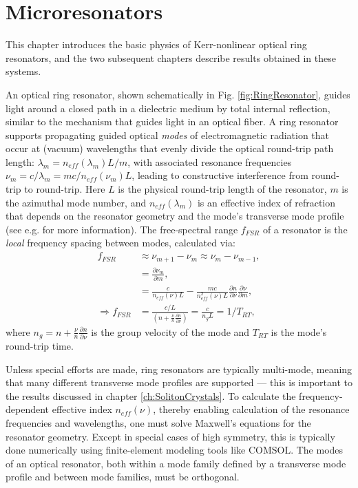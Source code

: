 \chapter{Microresonators}
 \label{ch:microresonators}
 
 This chapter introduces the basic physics of Kerr-nonlinear optical ring resonators, and the two  subsequent chapters describe results obtained in these systems.
 
An optical ring resonator, shown schematically in Fig. \ref{fig:RingResonator}, guides light around a closed path in a dielectric medium by total internal reflection, similar to the mechanism that guides light in an optical fiber. A ring resonator supports propagating guided optical \textit{modes} of electromagnetic radiation that occur at (vacuum) wavelengths that evenly divide the optical round-trip path length: $\lambda_m=n_{eff}(\lambda_m)L/m$, with associated resonance frequencies $\nu_m=c/\lambda_m=mc/n_{eff}(\nu_m)L$, leading to constructive interference from round-trip to round-trip. Here $L$ is the physical round-trip length of the resonator, $m$ is the azimuthal mode number, and $n_{eff}(\lambda_m)$ is an effective index of refraction that depends on the resonator geometry and the mode's transverse mode profile (see e.g. \cite{REFHERE} for more information). The free-spectral range $f_{FSR}$ of a resonator is the \textit{local} frequency spacing between modes, calculated via:
\begin{align}
	f_{FSR}&\approx \nu_{m+1}-\nu_{m}\approx \nu_{m}-\nu_{m-1},\\
	&=\frac{\partial\nu_m}{\partial m},\\
	&=\frac{c}{n_{eff}(\nu)L}-\frac{mc}{n_{eff}^2(\nu)L}\frac{\partial n}{\partial \nu}\frac{\partial \nu}{\partial m},\\
	\Rightarrow f_{FSR}&=\frac{c/L}{\left(n+\frac{\nu}{n}\frac{\partial n}{\partial \nu}\right)}=\frac{c}{n_g L}=1/T_{RT},
\end{align}
	where $n_g=n+\frac{\nu}{n}\frac{\partial n}{\partial \nu}$ is the group velocity of the mode and $T_{RT}$ is the mode's round-trip time.
	
	 Unless special efforts are made, ring resonators are typically multi-mode, meaning that many different transverse mode profiles are supported --- this is important to the results discussed in chapter \ref{ch:SolitonCrystals}. To calculate the frequency-dependent effective index $n_{eff}(\nu)$, thereby enabling calculation of the resonance frequencies and wavelengths, one must solve Maxwell's equations for the resonator geometry. Except in special cases of high symmetry, this is typically done numerically using finite-element modeling tools like COMSOL. The modes of an optical resonator, both within a mode family defined by a transverse mode profile and between mode families, must be orthogonal. 

